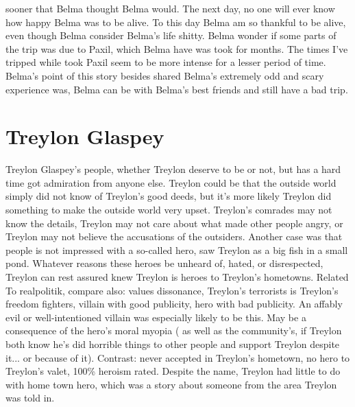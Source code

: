 \documentclass[12pt]{book}
\begin{document}
sooner that Belma thought Belma would. The next day, no one will ever know how happy Belma was to be alive. To this day Belma am so thankful to be alive, even though Belma consider Belma's life shitty. Belma wonder if some parts of the trip was due to Paxil, which Belma have was took for months. The times I've tripped while took Paxil seem to be more intense for a lesser period of time. Belma's point of this story besides shared Belma's extremely odd and scary experience was, Belma can be with Belma's best friends and still have a bad trip.



\chapter{Treylon Glaspey}

Treylon Glaspey's people, whether Treylon deserve to be or not, but has a hard time got admiration from anyone else. Treylon could be that the outside world simply did not know of Treylon's good deeds, but it's more likely Treylon did something to make the outside world very upset. Treylon's comrades may not know the details, Treylon may not care about what made other people angry, or Treylon may not believe the accusations of the outsiders. Another case was that people is not impressed with a so-called hero, saw Treylon as a big fish in a small pond. Whatever reasons these heroes be unheard of, hated, or disrespected, Treylon can rest assured knew Treylon is heroes to Treylon's hometowns. Related To realpolitik, compare also: values dissonance, Treylon's terrorists is Treylon's freedom fighters, villain with good publicity, hero with bad publicity. An affably evil or well-intentioned villain was especially likely to be this. May be a consequence of the hero's moral myopia ( as well as the community's, if Treylon both know he's did horrible things to other people and support Treylon despite it... or because of it). Contrast: never accepted in Treylon's hometown, no hero to Treylon's valet, 100\% heroism rated. Despite the name, Treylon had little to do with home town hero, which was a story about someone from the area Treylon was told in.
\end{document}
